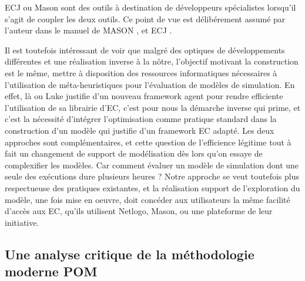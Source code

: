 ECJ ou Mason sont des outils à destination de développeurs spécialistes lorsqu'il s'agit de coupler les deux outils. Ce point de vue est délibérement assumé par l'auteur dans le manuel de MASON , et ECJ .

Il est toutefois intéressant de voir que malgré des optiques de développements différentes et une réalisation inverse à la nôtre, l'objectif motivant la construction est le même, mettre à disposition des ressources informatiques nécessaires à l'utilisation de méta-heuristiques pour l'évaluation de modèles de simulation. En effet, là ou Luke justifie d'un nouveau framework agent pour rendre efficiente l'utilisation de sa librairie d'EC, c'est pour nous la démarche inverse qui prime, et c'est la nécessité d'intégrer l'optimisation comme pratique standard dans la construction d'un modèle qui justifie d'un framework EC adapté. Les deux approches sont complémentaires, et cette question de l'efficience légitime tout à fait un changement de support de modélisation dès lors qu'on essaye de complexifier les modèles. Car comment évaluer un modèle de simulation dont une seule des exécutions dure plusieurs heures ? Notre approche se veut toutefois plus respectueuse des pratiques existantes, et la réalisation support de l'exploration du modèle, une fois mise en oeuvre, doit concéder aux utilisateurs la même facilité d'accès aux EC, qu'ils utilisent Netlogo, Mason, ou une plateforme de leur initiative.

\subsection{Une analyse critique de la méthodologie moderne POM}
\label{ssec:critique_pom}



